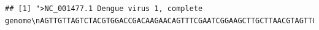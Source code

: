\documentclass[
]{book}
\begin{document}
\begin{verbatim}
## [1] ">NC_001477.1 Dengue virus 1, complete genome\nAGTTGTTAGTCTACGTGGACCGACAAGAACAGTTTCGAATCGGAAGCTTGCTTAACGTAGTTCTAACAGT\nTTTTTATTAGAGAGCAGATCTCTGATGAACAACCAACGGAAAAAGACGGGTCGACCGTCTTTCAATATGC\nTGAAACGCGCGAGAAACCGCGTGTCAACTGTTTCACAGTTGGCGAAGAGATTCTCAAAAGGATTGCTTTC\nAGGCCAAGGACCCATGAAATTGGTGATGGCTTTTATAGCATTCCTAAGATTTCTAGCCATACCTCCAACA\nGCAGGAATTTTGGCTAGATGGGGCTCATTCAAGAAGAATGGAGCGATCAAAGTGTTACGGGGTTTCAAGA\nAAGAAATCTCAAACATGTTGAACATAATGAACAGGAGGAAAAGATCTGTGACCATGCTCCTCATGCTGCT\nGCCCACAGCCCTGGCGTTCCATCTGACCACCCGAGGGGGAGAGCCGCACATGATAGTTAGCAAGCAGGAA\nAGAGGAAAATCACTTTTGTTTAAGACCTCTGCAGGTGTCAACATGTGCACCCTTATTGCAATGGATTTGG\nGAGAGTTATGTGAGGACACAATGACCTACAAATGCCCCCGGATCACTGAGACGGAACCAGATGACGTTGA\nCTGTTGGTGCAATGCCACGGAGACATGGGTGACCTATGGAACATGTTCTCAAACTGGTGAACACCGACGA\nGACAAACGTTCCGTCGCACTGGCACCACACGTAGGGCTTGGTCTAGAAACAAGAACCGAAACGTGGATGT\nCCTCTGAAGGCGCTTGGAAACAAATACAAAAAGTGGAGACCTGGGCTCTGAGACACCCAGGATTCACGGT\nGATAGCCCTTTTTCTAGCACATGCCATAGGAACATCCATCACCCAGAAAGGGATCATTTTTATTTTGCTG\nATGCTGGTAACTCCATCCATGGCCATGCGGTGCGTGGGAATAGGCAACAGAGACTTCGTGGAAGGACTGT\nCAGGAGCTACGTGGGTGGATGTGGTACTGGAGCATGGAAGTTGCGTCACTACCATGGCAAAAGACAAACC\nAACACTGGACATTGAACTCTTGAAGACGGAGGTCACAAACCCTGCCGTCCTGCGCAAACTGTGCATTGAA\nGCTAAAATATCAAACACCACCACCGATTCGAGATGTCCAACACAAGGAGAAGCCACGCTGGTGGAAGAAC\nAGGACACGAACTTTGTGTGTCGACGAACGTTCGTGGACAGAGGCTGGGGCAATGGTTGTGGGCTATTCGG\nAAAAGGTAGCTTAATAACGTGTGCTAAGTTTAAGTGTGTGACAAAACTGGAAGGAAAGATAGTCCAATAT\nGAAAACTTAAAATATTCAGTGATAGTCACCGTACACACTGGAGACCAGCACCAAGTTGGAAATGAGACCA\nCAGAACATGGAACAACTGCAACCATAACACCTCAAGCTCCCACGTCGGAAATACAGCTGACAGACTACGG\nAGCTCTAACATTGGATTGTTCACCTAGAACAGGGCTAGACTTTAATGAGATGGTGTTGTTGACAATGAAA\nAAAAAATCATGGCTCGTCCACAAACAATGGTTTCTAGACTTACCACTGCCTTGGACCTCGGGGGCTTCAA\nCATCCCAAGAGACTTGGAATAGACAAGACTTGCTGGTCACATTTAAGACAGCTCATGCAAAAAAGCAGGA\nAGTAGTCGTACTAGGATCACAAGAAGGAGCAATGCACACTGCGTTGACTGGAGCGACAGAAATCCAAACG\nTCTGGAACGACAACAATTTTTGCAGGACACCTGAAATGCAGATTAAAAATGGATAAACTGATTTTAAAAG\nGGATGTCATATGTAATGTGCACAGGGTCATTCAAGTTAGAGAAGGAAGTGGCTGAGACCCAGCATGGAAC\nTGTTCTAGTGCAGGTTAAATACGAAGGAACAGATGCACCATGCAAGATCCCCTTCTCGTCCCAAGATGAG\nAAGGGAGTAACCCAGAATGGGAGATTGATAACAGCCAACCCCATAGTCACTGACAAAGAAAAACCAGTCA\nACATTGAAGCGGAGCCACCTTTTGGTGAGAGCTACATTGTGGTAGGAGCAGGTGAAAAAGCTTTGAAACT\nAAGCTGGTTCAAGAAGGGAAGCAGTATAGGGAAAATGTTTGAAGCAACTGCCCGTGGAGCACGAAGGATG\nGCCATCCTGGGAGACACTGCATGGGACTTCGGTTCTATAGGAGGGGTGTTCACGTCTGTGGGAAAACTGA\nTACACCAGATTTTTGGGACTGCGTATGGAGTTTTGTTCAGCGGTGTTTCTTGGACCATGAAGATAGGAAT\nAGGGATTCTGCTGACATGGCTAGGATTAAACTCAAGGAGCACGTCCCTTTCAATGACGTGTATCGCAGTT\nGGCATGGTCACACTGTACCTAGGAGTCATGGTTCAGGCGGACTCGGGATGTGTAATCAACTGGAAAGGCA\nGAGAACTCAAATGTGGAAGCGGCATTTTTGTCACCAATGAAGTCCACACCTGGACAGAGCAATATAAATT\nCCAGGCCGACTCCCCTAAGAGACTATCAGCGGCCATTGGGAAGGCATGGGAGGAGGGTGTGTGTGGAATT\nCGATCAGCCACTCGTCTCGAGAACATCATGTGGAAGCAAATATCAAATGAATTAAACCACATCTTACTTG\nAAAATGACATGAAATTTACAGTGGTCGTAGGAGACGTTAGTGGAATCTTGGCCCAAGGAAAGAAAATGAT\nTAGGCCACAACCCATGGAACACAAATACTCGTGGAAAAGCTGGGGAAAAGCCAAAATCATAGGAGCAGAT\nGTACAGAATACCACCTTCATCATCGACGGCCCAAACACCCCAGAATGCCCTGATAACCAAAGAGCATGGA\nACATTTGGGAAGTTGAAGACTATGGATTTGGAATTTTCACGACAAACATATGGTTGAAATTGCGTGACTC\nCTACACTCAAGTGTGTGACCACCGGCTAATGTCAGCTGCCATCAAGGATAGCAAAGCAGTCCATGCTGAC\nATGGGGTACTGGATAGAAAGTGAAAAGAACGAGACTTGGAAGTTGGCAAGAGCCTCCTTCATAGAAGTTA\nAGACATGCATCTGGCCAAAATCCCACACTCTAT
\end{verbatim}
\end{document}

